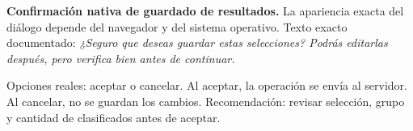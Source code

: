 \begin{operacionsensible}
\textbf{Confirmación nativa de guardado de resultados.}
La apariencia exacta del diálogo depende del navegador y del sistema operativo. Texto exacto documentado:
\emph{¿Seguro que deseas guardar estas selecciones? Podrás editarlas después, pero verifica bien antes de continuar.}

Opciones reales: aceptar o cancelar. Al aceptar, la operación se envía al servidor. Al cancelar, no se guardan los cambios. Recomendación: revisar selección, grupo y cantidad de clasificados antes de aceptar.
\end{operacionsensible}
